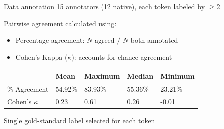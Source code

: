 \documentclass[xcolor={dvipsnames}]{beamer}
\begin{document}
\begin{frame}{Data annotation}
	15 annotators (12 native), each token labeled by $\geq$2 
	
	\vfill
	
	Pairwise agreement calculated using:
		\begin{itemize}
		\item Percentage agreement: $N$ agreed $/$ $N$ both annotated
		\item Cohen's Kappa %
		($\kappa$): accounts for chance agreement
		\end{itemize}
\vfill

		\begin{table}
			\centering
			\small
			\begin{tabularx}{\textwidth}{lXXXX}
			\toprule
			 								& Mean & Maximum & Median & Minimum \\
			 \midrule
			 \% Agreement 		& 54.92\% & 83.93\% & 55.36\% & 23.21\% \\
			 Cohen's $\kappa$	& 0.23 & 0.61 & 0.26 & -0.01 \\
			 \bottomrule
			\end{tabularx}					
			\label{tab:agreement:overall}
		\end{table}
	
	\vfill
	Single gold-standard label selected for each token

\end{frame}
\end{document}

